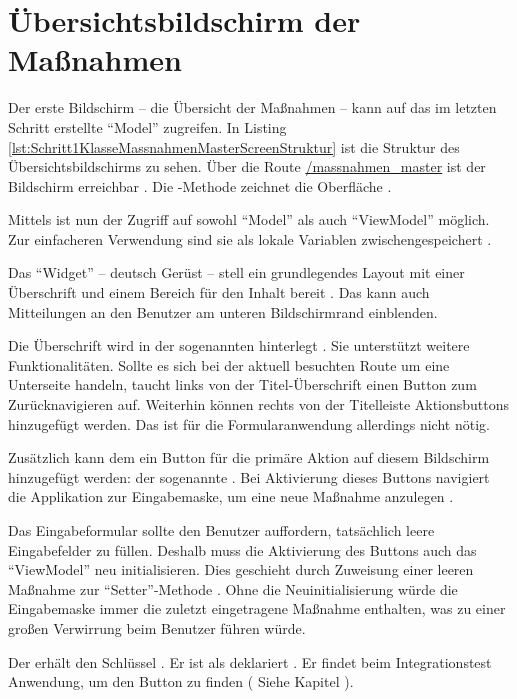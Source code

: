 

\section{Übersichtsbildschirm der Maßnahmen}

Der erste Bildschirm -- die Übersicht der Maßnahmen -- kann auf das im letzten Schritt erstellte \enquote{Model} zugreifen.
In Listing \ref{lst:Schritt1KlasseMassnahmenMasterScreenStruktur}  ist die Struktur des Übersichtsbildschirms zu sehen.
Über die Route \url{/massnahmen_master} ist der Bildschirm erreichbar . Die -Methode zeichnet die Oberfläche .

Mittels  ist nun der Zugriff auf sowohl \enquote{Model} als auch \enquote{ViewModel} möglich. Zur einfacheren Verwendung sind sie als lokale Variablen zwischengespeichert .

Das \enquote{Widget}  -- deutsch Gerüst --  stell  ein grundlegendes Layout mit einer Überschrift und einem Bereich für den Inhalt bereit .
Das  kann auch Mitteilungen an den Benutzer am unteren Bildschirmrand einblenden.

Die Überschrift wird in der sogenannten  hinterlegt .
Sie unterstützt weitere Funktionalitäten.
Sollte es sich bei der aktuell besuchten Route  um eine Unterseite handeln, taucht links von der Titel-Überschrift einen Button zum Zurücknavigieren auf.
Weiterhin können rechts von der Titelleiste Aktionsbuttons hinzugefügt werden. Das ist für die Formularanwendung allerdings nicht nötig.

Zusätzlich kann dem  ein Button für die primäre Aktion auf diesem Bildschirm hinzugefügt werden: der sogenannte  .
Bei Aktivierung dieses Buttons navigiert die Applikation zur Eingabemaske, um eine neue Maßnahme anzulegen .

Das Eingabeformular sollte den Benutzer auffordern, tatsächlich leere Eingabefelder zu füllen.
Deshalb muss die Aktivierung des Buttons auch das \enquote{ViewModel} neu initialisieren.
Dies geschieht durch Zuweisung einer leeren Maßnahme zur \enquote{Setter}-Methode  .
Ohne die Neuinitialisierung würde die Eingabemaske immer die zuletzt eingetragene Maßnahme enthalten, was zu einer großen Verwirrung beim Benutzer führen würde.

Der  erhält den Schlüssel  .
Er ist als  deklariert .
Er findet beim Integrationstest Anwendung, um den Button zu finden ( Siehe Kapitel ).

